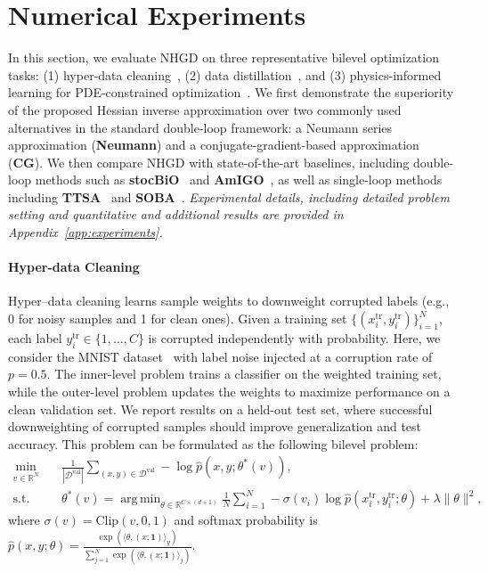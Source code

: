 \documentclass[11 pt]{article}
\DeclareMathOperator*{\argmin}{arg\,min}
\begin{document}
\section{Numerical Experiments}\label{sec:numerical_exp}
In this section, we evaluate NHGD on three representative bilevel optimization tasks: (1) hyper-data cleaning~\cite{franceschi2017forward}, 
(2) data distillation~\cite{lorraine2020optimizing}, and 
(3) physics-informed learning for PDE-constrained optimization~\cite{hao2023bi}. 
We first demonstrate the superiority of the proposed Hessian inverse approximation over two commonly used alternatives in the standard double-loop framework: 
a Neumann series approximation (\textbf{Neumann}) and a conjugate-gradient-based approximation (\textbf{CG}). 
We then compare NHGD with state-of-the-art baselines, including double-loop methods such as \textbf{stocBiO}~\cite{ji2021bilevel} and \textbf{AmIGO}~\cite{arbel2021amortized}, 
as well as single-loop methods including \textbf{TTSA}~\cite{hong2023two} and \textbf{SOBA}~\cite{dagreou2022framework}. \emph{Experimental details, including detailed problem setting and quantitative and additional results are provided in Appendix~\ref{app:experiments}.}





\paragraph{Hyper-data Cleaning}

Hyper--data cleaning learns sample weights to downweight corrupted labels (e.g., 0 for noisy samples and 1 for clean ones). Given a training set $\{(x_i^{\text{tr}}, y_i^{\text{tr}})\}_{i=1}^N$, 
each label $y_i^{\text{tr}} \in \{1,\dots,C\}$ is corrupted independently with probability. Here, we consider the MNIST dataset~\cite{lecun2002gradient} with label noise injected at a corruption rate of $p=0.5$. 
The inner-level problem trains a classifier on the weighted training set, while the outer-level problem updates the weights to maximize  performance on a clean validation set. 
We report results on a held-out test set, where successful downweighting of corrupted samples should improve generalization and test accuracy. This problem can be formulated as the following bilevel problem:
\begin{align*}
    \min_{v \in \mathbb{R}^N} \quad 
    & \frac{1}{|\mathcal{D}^{\mathrm{val}}|}
      \sum_{(x,y)\in\mathcal{D}^{\mathrm{val}}}
      -\log \hat{p}(x,y;\theta^*(v)), \\
    \text{s.t.} \quad 
    & \theta^*(v) 
    = 
    \argmin_{\theta \in \mathbb{R}^{C\times(d+1)}} 
    \frac{1}{N}
    \sum_{i=1}^N  
    -\sigma(v_i)\log \hat{p}(x_i^{\mathrm{tr}},y_i^{\mathrm{tr}};\theta)
    + \lambda\|\theta\|^2,
\end{align*}
where $\sigma(v)=\mathrm{Clip}(v,0,1)$ and softmax probability is $\hat{p}(x,y;\theta)
=
\frac{\exp(\langle \theta, (x;\mathbf{1})\rangle_y)}
     {\sum_{j=1}^{N} \exp(\langle \theta, (x;\mathbf{1})\rangle_j)}$.
\end{document}
